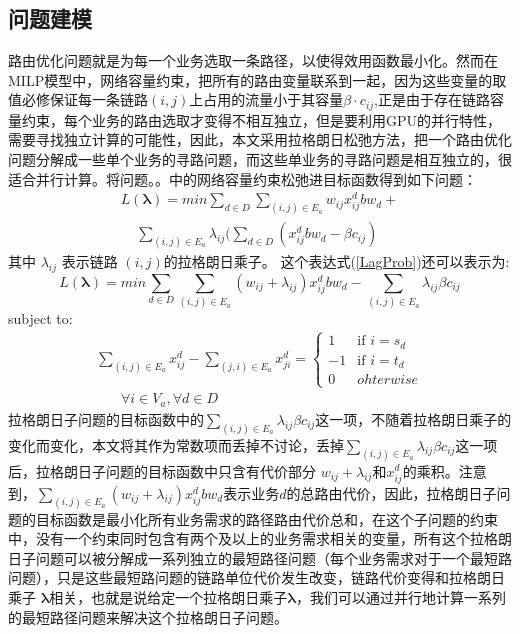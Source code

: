 \subsection{问题建模}  
  路由优化问题就是为每一个业务选取一条路径，以使得效用函数最小化。然而在MILP模型中，网络容量约束，把所有的路由变量联系到一起，因为这些变量的取值必修保证每一条链路$(i,j)$上占用的流量小于其容量$\beta\cdot c_{ij}$,正是由于存在链路容量约束，每个业务的路由选取才变得不相互独立，但是要利用GPU的并行特性，需要寻找独立计算的可能性，因此，本文采用拉格朗日松弛方法，把一个路由优化问题分解成一些单个业务的寻路问题，而这些单业务的寻路问题是相互独立的，很适合并行计算。将问题。。中的网络容量约束松弛进目标函数得到如下问题：
\begin{equation}\label{LagProb}
\begin{split}
L(\mathbf{\lambda})= min\sum\limits_{d \in D}\sum\limits_{(i,j) \in E_a} w_{ij}x_{ij}^d bw_d+ \\ ~~~~~\sum\limits_{(i,j) \in E_a}\lambda_{ij}(\sum\limits_{d \in D} (x_{ij}^d bw_d-\beta c_{ij})
\end{split}
\end{equation}
其中 $\lambda_{ij}$ 表示链路 $(i,j)$的拉格朗日乘子。
这个表达式(\ref{LagProb})还可以表示为:
\begin{equation}\label{Lagprob1}
L(\mathbf{\lambda})= min\sum\limits_{d \in D}\sum\limits_{(i,j) \in E_a} (w_{ij}+\lambda_{ij})x_{ij}^dbw_d -\sum\limits_{(i,j) \in E_a}\lambda_{ij}\beta c_{ij}
\end{equation}
subject to:
\begin{equation}\label{FlowConv2}
\begin{split}
\sum\limits_{(i,j) \in E_a} x_{ij}^d - \sum\limits_{(j,i) \in E_a} x_{ji}^d
=\begin{cases}
1 & \text{if $i = s_d$}\\
-1 & \text{if $i = t_d$} \\
0 &{ohterwise}
\end{cases}
\\~~~~~~~~\forall i\in V_a, \forall d\in D
\end{split}
\end{equation}
 拉格朗日子问题的目标函数中的$\sum_{(i,j) \in E_a}\lambda_{ij}\beta c_{ij}$这一项，不随着拉格朗日乘子的变化而变化，本文将其作为常数项而丢掉不讨论，丢掉$\sum_{(i,j) \in E_a}\lambda_{ij}\beta c_{ij}$这一项后，拉格朗日子问题的目标函数中只含有代价部分 $w_{ij}+\lambda_{ij}$和$x_{ij}^d$的乘积。注意到，$\sum_{(i,j) \in E_a} (w_{ij}+\lambda_{ij})x_{ij}^d bw_d$表示业务$d$的总路由代价，因此，拉格朗日子问题的目标函数是最小化所有业务需求的路径路由代价总和，在这个子问题的约束中，没有一个约束同时包含有两个及以上的业务需求相关的变量，所有这个拉格朗日子问题可以被分解成一系列独立的最短路径问题（每个业务需求对于一个最短路问题），只是这些最短路问题的链路单位代价发生改变，链路代价变得和拉格朗日乘子 $\mathbf{\lambda}$相关，也就是说给定一个拉格朗日乘子$\mathbf{\lambda}$，我们可以通过并行地计算一系列的最短路径问题来解决这个拉格朗日子问题。
